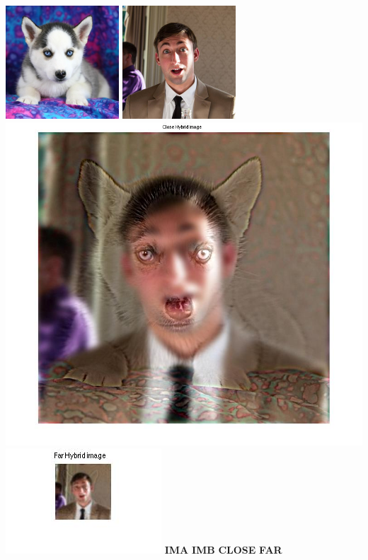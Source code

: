 \documentclass[12pt,twoside]{article}
\newcommand{\tabUnit}{3ex}
\newcommand{\tabT}{\hspace*{\tabUnit}}
\begin{document}
\hspace*{-20pt}
\includegraphics[width = 120pt, trim = 0pt 0pt 0pt 0pt, clip]{husky}
\includegraphics[width = 120pt]{andremo_pic}
\includegraphics[scale = .27, trim = 75pt 50pt 75pt 0pt, clip]{close_hybrid_image}
\includegraphics[scale = .7, trim = 75pt 50pt 20pt 20pt, clip]{far_hybrid_image}
\newline
\tabT\tabT\tabT \textbf{IMA}
\tabT\tabT\tabT\tabT\tabT\tabT \textbf{IMB}
\tabT\tabT\tabT\tabT\tabT\tabT\tabT \textbf{CLOSE}
\tabT\tabT\tabT\tabT \textbf{FAR}
\end{document}
